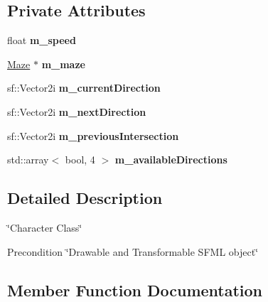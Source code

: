 \subsection*{Private Attributes}
\begin{DoxyCompactItemize}
\item 
\mbox{\label{classCharacter_a7d7a6d44667cbe171f18ea7142f39289}} 
float {\bfseries m\+\_\+speed}
\item 
\mbox{\label{classCharacter_a0124893049becf79727cb2f5ef031584}} 
\hyperlink{classMaze}{Maze} $\ast$ {\bfseries m\+\_\+maze}
\item 
\mbox{\label{classCharacter_a27e12d144a7138122d9e315782de21ae}} 
sf\+::\+Vector2i {\bfseries m\+\_\+current\+Direction}
\item 
\mbox{\label{classCharacter_a0334ba3fe08a527bb3d5cf5a2fc28dd4}} 
sf\+::\+Vector2i {\bfseries m\+\_\+next\+Direction}
\item 
\mbox{\label{classCharacter_afd9aba6e89508feb037a3c20d9dbf6ca}} 
sf\+::\+Vector2i {\bfseries m\+\_\+previous\+Intersection}
\item 
\mbox{\label{classCharacter_a8774230073c73c4bc11d939e07bcae9f}} 
std\+::array$<$ bool, 4 $>$ {\bfseries m\+\_\+available\+Directions}
\end{DoxyCompactItemize}


\subsection{Detailed Description}
\char`\"{}\+Character Class\char`\"{} 

\begin{DoxyPrecond}{Precondition}
\char`\"{}\+Drawable and Transformable S\+F\+M\+L object\char`\"{} 
\end{DoxyPrecond}


\subsection{Member Function Documentation}
\mbox{\label{classCharacter_af12a30a3a299cafe423d1554624c4c3f}} 
